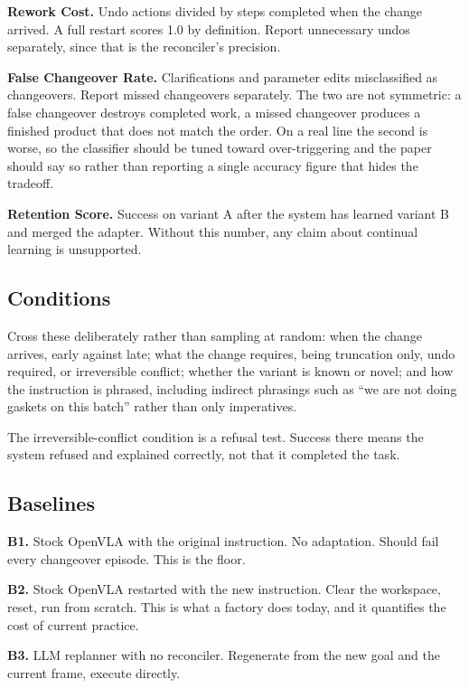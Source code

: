 \documentclass[conference]{IEEEtran}
\begin{document}
\textbf{Rework Cost.} Undo actions divided by steps completed when the
change arrived. A full restart scores 1.0 by definition. Report
unnecessary undos separately, since that is the reconciler's precision.

\textbf{False Changeover Rate.} Clarifications and parameter edits
misclassified as changeovers. Report missed changeovers separately. The
two are not symmetric: a false changeover destroys completed work, a
missed changeover produces a finished product that does not match the
order. On a real line the second is worse, so the classifier should be
tuned toward over-triggering and the paper should say so rather than
reporting a single accuracy figure that hides the tradeoff.

\textbf{Retention Score.} Success on variant A after the system has
learned variant B and merged the adapter. Without this number, any claim
about continual learning is unsupported.

\subsection{Conditions}

Cross these deliberately rather than sampling at random: when the change
arrives, early against late; what the change requires, being truncation
only, undo required, or irreversible conflict; whether the variant is
known or novel; and how the instruction is phrased, including indirect
phrasings such as ``we are not doing gaskets on this batch'' rather than
only imperatives.

The irreversible-conflict condition is a refusal test. Success there
means the system refused and explained correctly, not that it completed
the task.

\subsection{Baselines}

\textbf{B1.} Stock OpenVLA with the original instruction. No adaptation.
Should fail every changeover episode. This is the floor.

\textbf{B2.} Stock OpenVLA restarted with the new instruction. Clear the
workspace, reset, run from scratch. This is what a factory does today,
and it quantifies the cost of current practice.

\textbf{B3.} LLM replanner with no reconciler. Regenerate from the new
goal and the current frame, execute directly.
\end{document}
